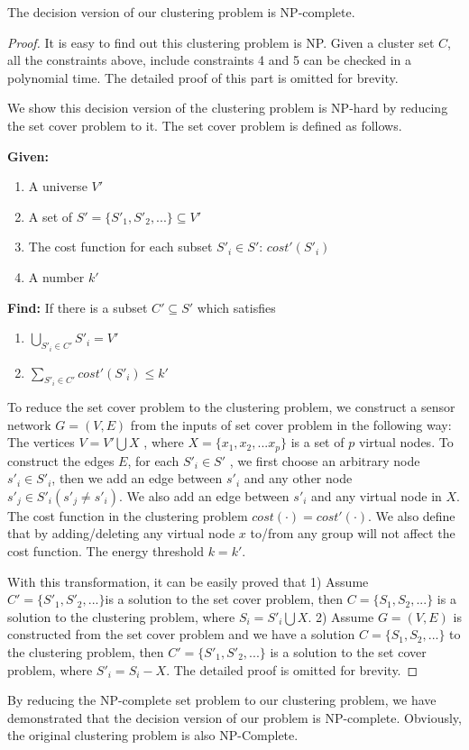 \begin{theorem}
The decision version of our clustering problem is NP-complete.
\end{theorem}

\begin{proof}
It is easy to find out this clustering problem is NP.  Given a cluster set \(C\), all the constraints above, include constraints 4 and 5 can be checked in a polynomial time. The detailed proof of this part is omitted for brevity.

We show this decision version of the clustering problem is NP-hard by reducing the set cover problem to it. The set cover problem is defined as follows.

\begin{flushleft}
\textbf{Given:}
\end{flushleft}
\begin{enumerate}
\item A universe \(V'\)
\item A set of \(S'=\{S'_1, S'_2, ...\}\subseteq V'\)
\item The cost function for each subset \(S'_i\in S'\): \(cost'(S'_i)\) 
\item A number \(k'\)
\end{enumerate}
\textbf{Find: }
If there is a subset \(C'\subseteq S'\) which satisfies
\begin{enumerate}
\item \( \bigcup\limits_{S'_i \in C'} S'_i =V'\)
\item \( \sum\limits_{S'_i \in C'} cost'(S'_i) \leq k'\)
\end{enumerate}

To reduce the set cover problem to the clustering problem, we construct a sensor network \(G=(V, E)\) from the inputs of set cover problem in the following way:
The vertices \(V =V'\bigcup X\) , where \(X = \{x_1,x_2,...x_p\}\)  is a set of \(p\) virtual nodes. 
To construct the edges \(E\), for each \(S'_i\in S'\) , we first choose an arbitrary  node \(s'_i\in S'_i\), then we add an edge between \(s'_i\) and any other node \(s'_j \in S'_i (s'_j\neq s'_i)\). We also add an edge between \(s'_i\) and any virtual node in \(X\). 
The cost function in the clustering problem \(cost(\cdot) = cost'(\cdot)\). We also define that by adding/deleting any virtual node \(x\) to/from any group will not affect the cost function. The energy threshold \(k=k'\). 

With this transformation, it can be easily proved that 1) Assume \(C'=\{S'_1, S'_2, ...\}\)is a solution to the set cover problem, then \(C=\{S_1, S_2, ...\}\)  is a solution to the clustering problem, where \(S_i = S'_i \bigcup X\). 2) Assume \(G =(V,E)\) is constructed from the set cover problem and we have a solution \(C=\{S_1, S_2, ...\}\) to the clustering problem, then \(C'=\{S'_1, S'_2, ...\}\) is a solution to the set cover problem, where \(S'_i=S_i - X\). The detailed proof is omitted for brevity. 
\end{proof}
By reducing the NP-complete set problem to our clustering problem, we have demonstrated that the decision version of our problem is NP-complete. Obviously, the original clustering problem is also NP-Complete.